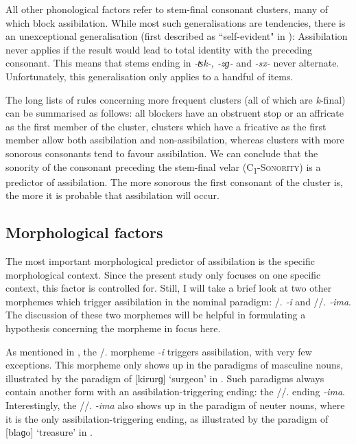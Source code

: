 \documentclass[output=paper,colorlinks,citecolor=brown]{langscibook}
\begin{document}
All other phonological factors refer to stem-final consonant clusters, many of which block assibilation. While most such generalisations are tendencies, there is an unexceptional generalisation (first described as ``self-evident" in 
\citealt[169]{maretic1963gramatika}): Assibilation never applies if the result would lead to total identity with the preceding consonant. This means that stems ending in \textit{-ʦk-, -zɡ-} and \textit{-sx-} never alternate. Unfortunately, this generalisation only applies to a handful of items. 

The long lists of rules concerning more frequent clusters (all of which are \textit{k}-final) can be summarised as follows: all blockers have an obstruent stop or an affricate as the first member of the cluster, clusters which have a fricative as the first member allow both assibilation and non-assibilation, whereas clusters with more sonorous consonants tend to favour assibilation. We can conclude that the sonority of the consonant preceding the stem-final velar (\textsc{C\textsubscript{1}-Sonority}) is a predictor of assibilation. The more sonorous the first consonant of the cluster is, the more it is probable that assibilation will occur.  

\subsection{Morphological factors}
\label{subsec:morphological}

The most important morphological predictor of assibilation is the specific morphological context. Since the present study only focuses on one specific context, this factor is controlled for. Still, I will take a brief look at two other morphemes which trigger assibilation in the nominal paradigm: {\NOM/\VOC.\PL} \textit{-i} and {\DAT}/{\LOC}/{\INS.\PL} \textit{-ima}. The discussion of these two morphemes will be helpful in formulating a hypothesis concerning the morpheme in focus here. 

As mentioned in , the {\NOM/\VOC.\PL} morpheme \textit{-i} triggers assibilation, with very few exceptions. This morpheme only shows up in the para\-digms of masculine nouns, illustrated by the paradigm of [{kirurɡ}] `surgeon' in  . Such paradigms always contain another form with an assibilation-trig\-ger\-ing ending: the {\DAT}/{\LOC}/{\INS.\PL} ending \textit{-ima}. Interestingly, the {\DAT}/{\LOC}{\slash}{\INS.\PL} \textit{\nobreakdash-ima} also shows up in the paradigm of neuter nouns, where it is the only assi\-bi\-la\-tion-triggering ending, as illustrated by the paradigm of [{blaɡo}] `treasure' in . 
\end{document}
